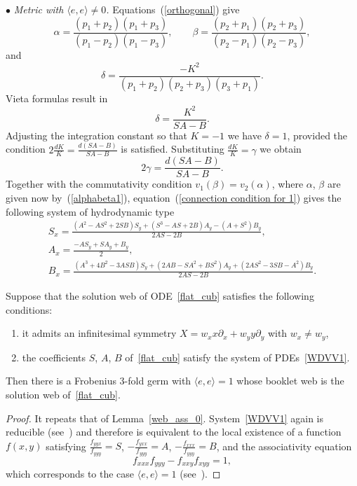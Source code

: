 \documentclass[pdftex]{sigma}
\begin{document}
$\bullet$ {\it Metric with $\langle e,e\rangle \ne 0$.}
Equations~(\ref{orthogonal}) give
\begin{equation}\label{alphabeta1}
\alpha =\frac{(p_1+p_2)(p_1+p_3)}{(p_1-p_2)(p_1-p_3)},\qquad \beta = \frac{(p_2+p_1)(p_2+p_3)}{(p_2-p_1)(p_2-p_3)},
\end{equation}
and
\[
\delta=\frac{-K^2}{(p_1+p_2)(p_2+p_3)(p_3+p_1)}.
\]
 Vieta formulas result in
\begin{equation}\label{dfor1}
\delta=\frac{K^2}{SA-B}.
\end{equation}
Adjusting the integration constant so that $K=-1$ we have $\delta =1$, provided the condition $2\frac{dK}{K}=\frac{d(SA-B)}{SA-B}$ is satisf\/ied. Substituting $\frac{dK}{K}=\gamma$ we obtain
\begin{equation}\label{connection condition for 1}
2\gamma=\frac{d(SA-B)}{SA-B}.
\end{equation}
Together with the commutativity condition $v_1(\beta)=v_2(\alpha)$, where $\alpha$, $\beta$ are given now by~(\ref{alphabeta1}), equation~(\ref{connection condition for 1}) gives the following system of hydrodynamic type
\begin{gather}
S_x= \frac{(A^2-AS^2+2SB)S_y+(S^3-AS+2B)A_y-(A+S^2)B_y}{2AS-2B},\nonumber\\
A_x= \frac{-AS_y+SA_y+B_y}{2},\nonumber\\
B_x= \frac{(A^3+4B^2-3ASB)S_y+(2AB-SA^2+BS^2)A_y+(2AS^2-3SB-A^2)B_y}{2AS-2B}.\label{WDVV1}
\end{gather}
\begin{lemma}\label{web_ass_1}
Suppose that the solution web of ODE~\eqref{flat_cub} satisfies the following conditions:
\begin{enumerate}\itemsep=0pt
\item[$1)$] it admits an infinitesimal symmetry $X=w_xx\partial_x+w_yy\partial_y$ with $w_x\ne w_y$,
\item[$2)$] the coefficients $S$, $A$, $B$ of~\eqref{flat_cub} satisfy the system of PDEs~\eqref{WDVV1}.
\end{enumerate}
Then there is a Frobenius $3$-fold germ with $\langle e,e\rangle =1$
whose booklet web is the solution web of~\eqref{flat_cub}.
\end{lemma}
\begin{proof} It repeats that of Lemma~\ref{web_ass_0}.
System~\eqref{WDVV1} again is reducible (see~\cite{Al})
and therefore is equivalent to the local existence of a function $f(x,y)$
satisfying $\frac{f_{yyx}}{f_{yyy}}=S$, $-\frac{f_{yxx}}{f_{yyy}}=A$, $-\frac{f_{xxx}}{f_{yyy}}=B$,
and the associativity equation
\begin{equation}\label{assDet}
f_{xxx}f_{yyy}-f_{xxy}f_{xyy}=1,
\end{equation}
 which corresponds to the case $\langle e,e\rangle =1$ (see~\cite{Df}).
\end{proof}
\end{document}
